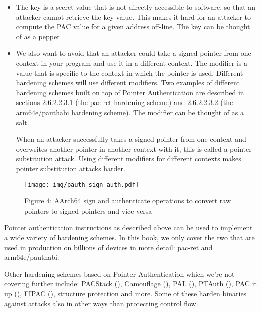 \documentclass[
  a4paper,
]{report}
\begin{document}
\begin{itemize}
\item
  The key is a secret value that is not directly accessible to software,
  so that an attacker cannot retrieve the key value. This makes it hard
  for an attacker to compute the PAC value for a given address off-line.
  The key can be thought of as a
  \href{https://en.wikipedia.org/wiki/Pepper_(cryptography)}{pepper}
\item
  We also want to avoid that an attacker could take a signed pointer
  from one context in your program and use it in a different context.
  The modifier is a value that is specific to the context in which the
  pointer is used. Different hardening schemes will use different
  modifiers. Two examples of different hardening schemes built on top of
  Pointer Authentication are described in sections
  \hyperref[sec:pac-ret]{2.6.2.2.3.1} (the pac-ret hardening scheme) and
  \hyperref[sec:arm64e-pauthabi]{2.6.2.2.3.2} (the arm64e/pauthabi
  hardening scheme). The modifier can be thought of as a
  \href{https://en.wikipedia.org/wiki/Salt_(cryptography)}{salt}.

  When an attacker successfully takes a signed pointer from one context
  and overwrites another pointer in another context with it, this is
  called a \label{__index_entry_56}{pointer substitution
  attack}. Using different modifiers
  for different contexts makes pointer substitution attacks harder.
\end{itemize}

\begin{figure}
\centering
\texttt{[image: img/pauth\_sign\_auth.pdf]}
\caption{Figure 4: AArch64 sign and authenticate operations to convert
raw pointers to signed pointers and vice
versa}\label{fig:pauth-sign-auth}
\end{figure}

Pointer authentication instructions as described above can be used to
implement a wide variety of hardening schemes. In this book, we only
cover the two that are used in production on billions of devices in more
detail: pac-ret and arm64e/pauthabi.

Other hardening schemes based on Pointer Authentication which we're not
covering further include: PACStack
(), Camouflage
(), PAL
(), PTAuth
(), PAC it up
(), FIPAC
(),
\href{https://discourse.llvm.org/t/rfc-structure-protection-a-family-of-uaf-mitigation-techniques/85555}{structure
protection} and more. Some of these harden binaries against attacks also
in other ways than protecting control flow.
\end{document}
